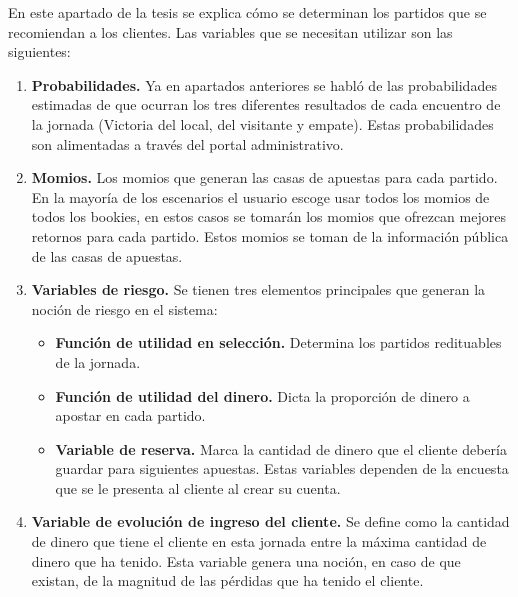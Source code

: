 En este apartado de la tesis se explica cómo se determinan los partidos que se recomiendan a los clientes.
Las variables que se necesitan utilizar son las siguientes:
\begin{enumerate}
	\item \textbf{Probabilidades.} Ya en apartados anteriores se habló de las probabilidades estimadas de que ocurran los tres diferentes resultados de cada encuentro de la jornada (Victoria del local, del visitante y empate). Estas probabilidades son alimentadas a través del portal administrativo.
	
	\item \textbf{Momios.} Los momios que generan las casas de apuestas para cada partido. En la mayoría de los escenarios el usuario escoge usar todos los momios de todos los bookies, en estos casos se tomarán los momios que ofrezcan mejores retornos para cada partido. Estos momios se toman de la información pública de las casas de apuestas.
	
	\item \textbf{Variables de riesgo.} Se tienen tres elementos principales que generan la noción de riesgo en el sistema:
	\begin{itemize}
		\item \textbf{Función de utilidad en selección.} Determina los partidos redituables de la jornada.
		\item \textbf{Función de utilidad del dinero.} Dicta la proporción de dinero a apostar en cada partido.
		\item \textbf{Variable de reserva.} Marca la cantidad de dinero que el cliente debería guardar para siguientes apuestas.
		Estas variables dependen de la encuesta que se le presenta al cliente al crear su cuenta.
	\end{itemize}
	
	\item \textbf{Variable de evolución de ingreso del cliente.} Se define como la cantidad de dinero que tiene el cliente en esta jornada entre la máxima cantidad de dinero que ha tenido. Esta variable genera una noción, en caso de que existan, de la magnitud de las pérdidas que ha tenido el cliente.
\end{enumerate}

